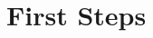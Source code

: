\documentclass[twoside,10pt]{book}
\begin{document}
%
%
%
%
%
%
%
%
%
%
%

\chapter{First Steps}
\label{first_steps}

\end{document}
